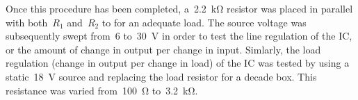 Once this procedure has been completed,
a~\SI{2.2}{\kilo\ohm} resistor was placed in parallel with both~$R_1$ and~$R_2$
to for an adequate load.  The source voltage was subsequently swept from~6
to~\SI{30}{\volt} in order to test the line regulation of the IC, or the amount
of change in output per change in input.  Simlarly, the load regulation (change
in output per change in load) of the IC was tested by using a
static~\SI{18}{\volt} source and replacing the load resistor for a decade box.
This resistance was varied from~\SI{100}{\ohm} to~\SI{3.2}{\kilo\ohm}.

\begin{figure}[H]
	\centering
	
	\caption{}
	\label{fig:vrLineReg}
\end{figure}

\begin{figure}[H]
	\centering
	
	\caption{}
	\label{fig:vrLoadReg}
\end{figure}

\begin{figure}[H]
	\centering
	
	\caption{}
	\label{fig:fullLoadReg}
\end{figure}
